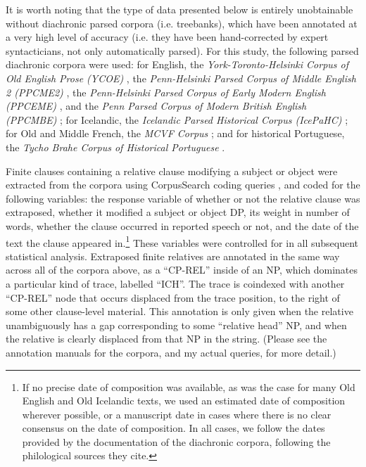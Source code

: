 It is worth noting that the type of data presented below is entirely unobtainable without diachronic parsed corpora (i.e. treebanks), which have been annotated at a very high level of accuracy (i.e. they have been hand-corrected by expert syntacticians, not only automatically parsed). For this study, the following parsed diachronic corpora were used: for English, the \textsl{York-Toronto-Helsinki Corpus of Old English Prose (YCOE)} \citep{ycoe}, the \textsl{Penn-Helsinki Parsed Corpus of Middle English 2 (PPCME2)} \citep{ppcme2}, the \textsl{Penn-Helsinki Parsed Corpus of Early Modern English (PPCEME)} \citep{ppceme}, and the \textsl{Penn Parsed Corpus of Modern British English (PPCMBE)} \citep{ppcmbe}; for Icelandic, the \textsl{Icelandic Parsed Historical Corpus (IcePaHC)} \citep{icepahc09}; for Old and Middle French, the \textsl{MCVF Corpus} \citep{mcvf}; and for historical Portuguese, the \textsl{Tycho Brahe Corpus of Historical Portuguese} \citep{tychobrahe}.

Finite clauses containing a relative clause modifying a subject or object were extracted from the corpora using CorpusSearch coding queries \citep{corpussearch}, and coded for the following variables: the response variable of whether or not the relative clause was extraposed, whether it modified a subject or object DP, its weight in number of words, whether the clause occurred in reported speech or not, and the date of the text the clause appeared in.\footnote{If no precise date of composition was available, as was the case for many Old English and Old Icelandic texts, we used an estimated date of composition wherever possible, or a manuscript date in cases where there is no clear consensus on the date of composition. In all cases, we follow the dates provided by the documentation of the diachronic corpora, following the philological sources they cite.} These variables were controlled for in all subsequent statistical analysis. Extraposed finite relatives are annotated in the same way across all of the corpora above, as a ``CP-REL'' inside of an NP, which dominates a particular kind of trace, labelled ``ICH''. The trace is coindexed with another ``CP-REL'' node that occurs displaced from the trace position, to the right of some other clause-level material. This annotation is only given when the relative unambiguously has a gap corresponding to some ``relative head'' NP, and when the relative is clearly displaced from that NP in the string. (Please see the annotation manuals for the corpora, and my actual queries, for more detail.)

